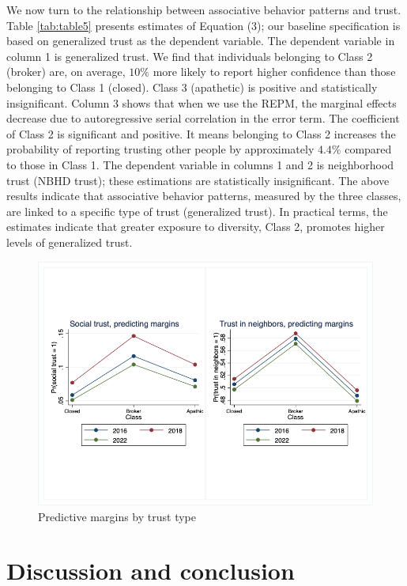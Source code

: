We now turn to the relationship between associative behavior patterns and trust. Table \ref{tab:table5} presents estimates of Equation (3); our baseline specification is based on generalized trust as the dependent variable. The dependent variable in column 1 is generalized trust. We find that individuals belonging to Class 2 (broker) are, on average, $10\%$ more likely to report higher confidence than those belonging to Class 1 (closed). Class 3 (apathetic) is positive and statistically insignificant. Column 3 shows that when we use the REPM, the marginal effects decrease due to autoregressive serial correlation in the error term. The coefficient of Class 2 is significant and positive. It means belonging to Class 2 increases the probability of reporting trusting other people by approximately $4.4\%$ compared to those in Class 1. The dependent variable in columns 1 and 2 is neighborhood trust (NBHD trust); these estimations are statistically insignificant. The above results indicate that associative behavior patterns, measured by the three classes, are linked to a specific type of trust (generalized trust). In practical terms, the estimates indicate that greater exposure to diversity, Class 2, promotes higher levels of generalized trust.





\begin{figure}[H]
    \centering
    \includegraphics[width=17cm]{output/figure3.png}
    \caption{Predictive margins by trust type}
    \label{fig:fig3}
\end{figure}



\section{Discussion and conclusion}

